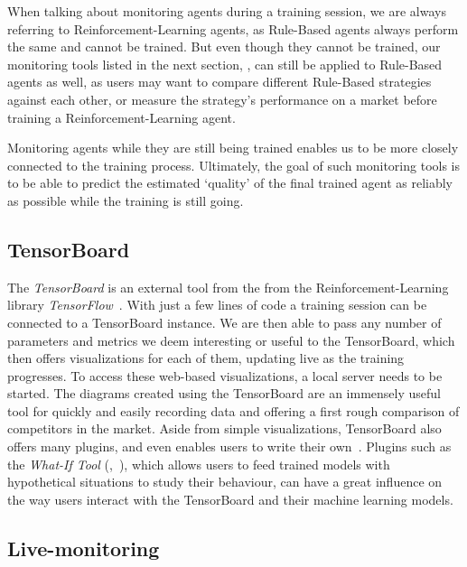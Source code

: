 When talking about monitoring agents during a training session, we are always referring to Reinforcement-Learning agents, as Rule-Based agents always perform the same and cannot be trained. But even though they cannot be trained, our monitoring tools listed in the next section, , can still be applied to Rule-Based agents as well, as users may want to compare different Rule-Based strategies against each other, or measure the strategy's performance on a market before training a Reinforcement-Learning agent.

Monitoring agents while they are still being trained enables us to be more closely connected to the training process. Ultimately, the goal of such monitoring tools is to be able to predict the estimated `quality' of the final trained agent as reliably as possible while the training is still going.

\subsection*{TensorBoard}\label{subsec:TensorBoard}

The \emph{TensorBoard} is an external tool from the from the Reinforcement-Learning library \emph{TensorFlow}~\cite{TensorFlow}. With just a few lines of code a training session can be connected to a TensorBoard instance. We are then able to pass any number of parameters and metrics we deem interesting or useful to the TensorBoard, which then offers visualizations for each of them, updating live as the training progresses. To access these web-based visualizations, a local server needs to be started. The diagrams created using the TensorBoard are an immensely useful tool for quickly and easily recording data and offering a first rough comparison of competitors in the market. Aside from simple visualizations, TensorBoard also offers many plugins, and even enables users to write their own~\cite{TensorBoardPlugins}. Plugins such as the \emph{What-If Tool} (\cite{WhatIfTool},~\cite{WhatIfToolWeb}), which allows users to feed trained models with hypothetical situations to study their behaviour, can have a great influence on the way users interact with the TensorBoard and their machine learning models.

\subsection*{Live-monitoring}\label{subsec:LiveMonitoring}

